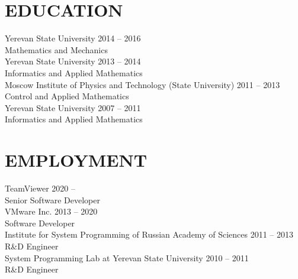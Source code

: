 \documentclass[10pt]{res}
\begin{document}
\begin{resume}


\section{EDUCATION}
\vspace{5pt}
	Yerevan State University \hfill 2014 -- 2016 \yearpostfix \\
	Mathematics and Mechanics \vspace{5pt} \\
	Yerevan State University \hfill 2013 -- 2014 \yearpostfix \\
	Informatics and Applied Mathematics \vspace{5pt} \\
	Moscow Institute of Physics and Technology (State University) \hfill 2011 -- 2013 \yearpostfix \\
	Control and Applied Mathematics \vspace{5pt} \\
	Yerevan State University \hfill 2007 -- 2011 \yearpostfix \\
	Informatics and Applied Mathematics

\section{EMPLOYMENT}
\vspace{5pt}
	TeamViewer \hfill 2020 -- \latestjobyear \yearpostfix \\
	Senior Software Developer \vspace{5pt} \\
	VMware Inc. \hfill 2013 -- 2020 \yearpostfix \\
	Software Developer \vspace{5pt} \\
	Institute for System Programming of Russian Academy of Sciences \hfill 2011 -- 2013 \yearpostfix \\%
	R\&D Engineer \vspace{5pt} \\
	System Programming Lab at Yerevan State University \hfill 2010 -- 2011 \yearpostfix \\
	R\&D Engineer


\end{resume}
\end{document}
